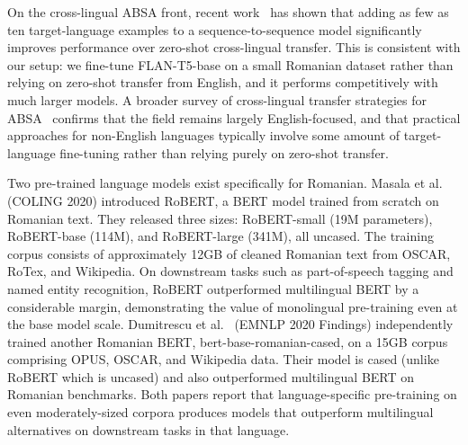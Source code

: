 \documentclass[12pt,a4paper]{report}
\begin{document}
On the cross-lingual ABSA front, recent work~\cite{fewshot_crosslingual_absa2025} has shown that adding as few as ten target-language examples to a sequence-to-sequence model significantly improves performance over zero-shot cross-lingual transfer. This is consistent with our setup: we fine-tune FLAN-T5-base on a small Romanian dataset rather than relying on zero-shot transfer from English, and it performs competitively with much larger models. A broader survey of cross-lingual transfer strategies for ABSA~\cite{crosslingual_transfer_absa2026} confirms that the field remains largely English-focused, and that practical approaches for non-English languages typically involve some amount of target-language fine-tuning rather than relying purely on zero-shot transfer.

Two pre-trained language models exist specifically for Romanian. Masala et al.~\cite{masala2020robert} (COLING 2020) introduced RoBERT, a BERT model trained from scratch on Romanian text. They released three sizes: RoBERT-small (19M parameters), RoBERT-base (114M), and RoBERT-large (341M), all uncased. The training corpus consists of approximately 12GB of cleaned Romanian text from OSCAR, RoTex, and Wikipedia. On downstream tasks such as part-of-speech tagging and named entity recognition, RoBERT outperformed multilingual BERT by a considerable margin, demonstrating the value of monolingual pre-training even at the base model scale. Dumitrescu et al.~\cite{dumitrescu2020birth} (EMNLP 2020 Findings) independently trained another Romanian BERT, bert-base-romanian-cased, on a 15GB corpus comprising OPUS, OSCAR, and Wikipedia data. Their model is cased (unlike RoBERT which is uncased) and also outperformed multilingual BERT on Romanian benchmarks. Both papers report that language-specific pre-training on even moderately-sized corpora produces models that outperform multilingual alternatives on downstream tasks in that language.
\end{document}
